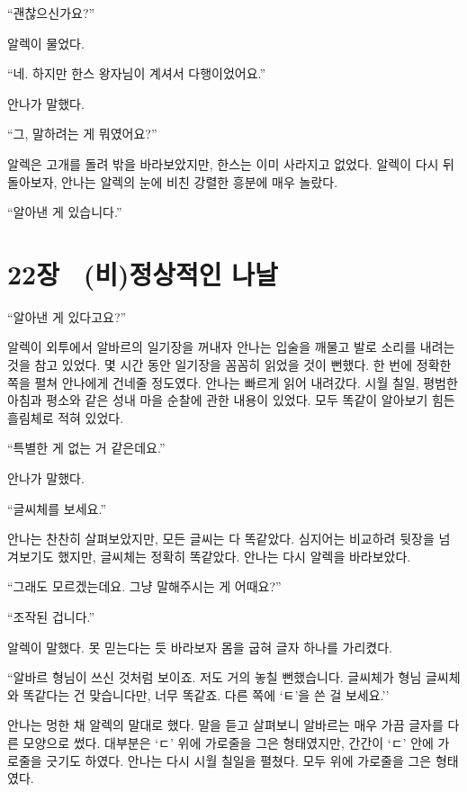 ``괜찮으신가요?''

알렉이 물었다.

``네. 하지만 한스 왕자님이 계셔서 다행이었어요.''

안나가 말했다.

``그, 말하려는 게 뭐였어요?''

알렉은 고개를 돌려 밖을 바라보았지만, 한스는 이미 사라지고 없었다. 알렉이 다시 뒤돌아보자, 안나는 알렉의 눈에 비친 강렬한 흥분에 매우 놀랐다.

``알아낸 게 있습니다.''



\chapter[22장  (비)정상적인 나날][22장\hspace*{.5em}(비)정상적인 나날]{22장 \ (비)정상적인 나날}



\forceindent``알아낸 게 있다고요?''

알렉이 외투에서 알바르의 일기장을 꺼내자 안나는 입술을 깨물고 발로 소리를 내려는 것을 참고 있었다. 몇 시간 동안 일기장을 꼼꼼히 읽었을 것이 뻔했다. 한 번에 정확한 쪽을 펼쳐 안나에게 건네줄 정도였다. 안나는 빠르게 읽어 내려갔다. 시월 칠일, 평범한 아침과 평소와 같은 성내 마을 순찰에 관한 내용이 있었다. 모두 똑같이 알아보기 힘든 흘림체로 적혀 있었다.

``특별한 게 없는 거 같은데요.''

안나가 말했다.

``글씨체를 보세요.''

안나는 찬찬히 살펴보았지만, 모든 글씨는 다 똑같았다. 심지어는 비교하려 뒷장을 넘겨보기도 했지만, 글씨체는 정확히 똑같았다. 안나는 다시 알렉을 바라보았다.

``그래도 모르겠는데요. 그냥 말해주시는 게 어때요?''

``조작된 겁니다.''

알렉이 말했다. 못 믿는다는 듯 바라보자 몸을 굽혀 글자 하나를 가리켰다.

``알바르 형님이 쓰신 것처럼 보이죠. 저도 거의 놓칠 뻔했습니다. 글씨체가 형님 글씨체와 똑같다는 건 맞습니다만, 너무 똑같죠. 다른 쪽에 `ㅌ'을 쓴 걸 보세요.''

안나는 멍한 채 알렉의 말대로 했다. 말을 듣고 살펴보니 알바르는 매우 가끔 글자를 다른 모양으로 썼다. 대부분은 `ㄷ' 위에 가로줄을 그은 형태였지만, 간간이 `ㄷ' 안에 가로줄을 긋기도 하였다. 안나는 다시 시월 칠일을 펼쳤다. 모두 위에 가로줄을 그은 형태였다.

